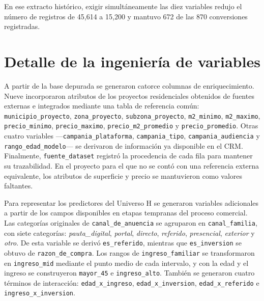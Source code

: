 En ese extracto histórico, exigir simultáneamente las diez variables redujo el
número de registros de 45{,}614 a 15{,}200 y mantuvo 672 de las 870 conversiones
registradas. 
\chapter{Detalle de la ingeniería de variables}
\label{anx:featureeng}

\begin{sloppypar}
A partir de la base depurada se generaron catorce columnas de enriquecimiento. Nueve
incorporaron atributos de los proyectos residenciales obtenidos de fuentes externas e
integrados mediante una tabla de referencia común: \texttt{municipio\_proyecto},
\texttt{zona\_proyecto}, \texttt{subzona\_proyecto}, \texttt{m2\_minimo},
\texttt{m2\_maximo}, \texttt{precio\_minimo}, \texttt{precio\_maximo},
\texttt{precio\_m2\_promedio} y \texttt{precio\_promedio}. Otras cuatro variables
---\texttt{campania\_plataforma}, \texttt{campania\_tipo},
\texttt{campania\_audiencia} y \texttt{rango\_edad\_modelo}--- se derivaron de
información ya disponible en el CRM. Finalmente, \texttt{fuente\_dataset} registró
la procedencia de cada fila para mantener su trazabilidad. En el proyecto para el que
no se contó con una referencia externa equivalente, los atributos de superficie y
precio se mantuvieron como valores faltantes.
\end{sloppypar}

\begin{sloppypar}
Para representar los predictores del Universo H se generaron variables adicionales a
partir de los campos disponibles en etapas tempranas del proceso comercial. Las
categorías originales de \texttt{canal\_de\_anuencia} se agruparon en
\texttt{canal\_familia}, con siete categorías: \textit{pauta\_digital},
\textit{portal}, \textit{directo}, \textit{referido}, \textit{presencial},
\textit{exterior} y \textit{otro}. De esta variable se derivó
\texttt{es\_referido}, mientras que \texttt{es\_inversion} se obtuvo de
\texttt{razon\_de\_compra}. Los rangos de \texttt{ingreso\_familiar} se
transformaron en \texttt{ingreso\_mid} mediante el punto medio de cada intervalo, y
con la edad y el ingreso se construyeron \texttt{mayor\_45} e
\texttt{ingreso\_alto}. También se generaron cuatro términos de interacción:
\texttt{edad\_x\_ingreso}, \texttt{edad\_x\_inversion},
\texttt{edad\_x\_referido} e \texttt{ingreso\_x\_inversion}.
\end{sloppypar}

